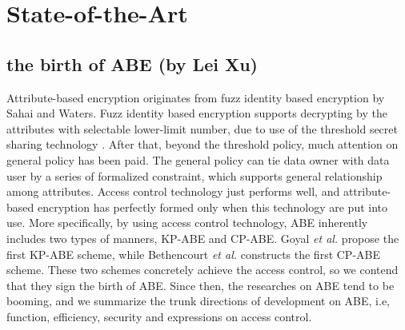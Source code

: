 \section{State-of-the-Art}
\subsection{the birth of ABE (by Lei Xu)}
Attribute-based encryption originates from fuzz identity based encryption \cite{Sahai:EUROCRYPT'05} by Sahai and Waters. 
Fuzz identity based encryption supports decrypting by the attributes with selectable lower-limit number,
due to use of the threshold secret sharing technology \cite{Shamir:CACM'79}.
After that, beyond the threshold policy, much attention on general policy has been paid.
The general policy can tie data owner with data user by a series of formalized constraint,
which supports general relationship among attributes.
Access control technology just performs well,
and attribute-based encryption has perfectly formed only when this technology are put into use.
More specifically, by using access control technology, ABE inherently includes two types of manners, KP-ABE and CP-ABE.
Goyal \emph{et al.} \cite{Goyal:CCS'06} propose the first KP-ABE scheme,
while Bethencourt \emph{et al.} \cite{Bethencourt:SP'07} constructs the first CP-ABE scheme.
These two schemes concretely achieve the access control,
so we contend that they sign the birth of ABE.
Since then, the researches on ABE tend to be booming,
and we summarize the trunk directions of development on ABE,
i.e, function, efficiency, security and expressions on access control.
